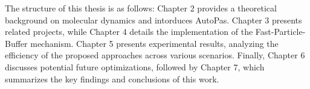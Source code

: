 
The structure of this thesis is as follows: Chapter 2 provides a theoretical background on molecular dynamics and intorduces AutoPas. Chapter 3 presents related projects, while Chapter 4 details the implementation of the Fast-Particle-Buffer mechanism. Chapter 5 presents experimental results, analyzing the efficiency of the proposed approaches across various scenarios. Finally, Chapter 6 discusses potential future optimizations, followed by Chapter 7, which summarizes the key findings and conclusions of this work.
